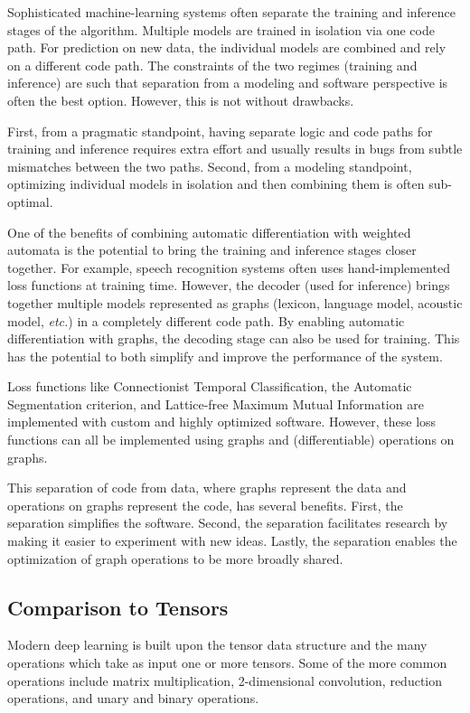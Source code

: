 \documentclass[main.tex]{subfiles}
\begin{document}
Sophisticated machine-learning systems often separate the training and
inference stages of the algorithm. Multiple models are trained in isolation via
one code path. For prediction on new data, the individual models are combined
and rely on a different code path. The constraints of the two regimes (training
and inference) are such that separation from a modeling and software
perspective is often the best option. However, this is not without drawbacks.

First, from a pragmatic standpoint, having separate logic and code paths for
training and inference requires extra effort and usually results in bugs from
subtle mismatches between the two paths. Second, from a modeling standpoint,
optimizing individual models in isolation and then combining them is often
sub-optimal.

One of the benefits of combining automatic differentiation with weighted
automata is the potential to bring the training and inference stages closer
together. For example, speech recognition systems often uses hand-implemented
loss functions at training time. However, the decoder (used for inference)
brings together multiple models represented as graphs (lexicon, language model,
acoustic model, \emph{etc.}) in a completely different code path. By enabling
automatic differentiation with graphs, the decoding stage can also be used for
training.  This has the potential to both simplify and improve the performance
of the system.

Loss functions like Connectionist Temporal Classification, the Automatic
Segmentation criterion, and Lattice-free Maximum Mutual Information are
implemented with custom and highly optimized software. However, these loss
functions can all be implemented using graphs and (differentiable) operations
on graphs.

This separation of code from data, where graphs represent the data and
operations on graphs represent the code, has several benefits. First, the
separation simplifies the software. Second, the separation facilitates research
by making it easier to experiment with new ideas. Lastly, the separation
enables the optimization of graph operations to be more broadly shared.

\subsection{Comparison to Tensors}
\label{sec:comparison_to_tensors}

Modern deep learning is built upon the tensor data structure and the many
operations which take as input one or more tensors. Some of the more common
operations include matrix multiplication, 2-dimensional convolution, reduction
operations, and unary and binary operations.
\end{document}
